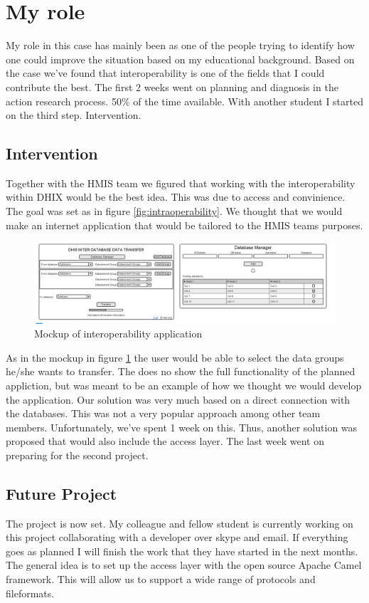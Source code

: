 \section{My role}
My role in this case has mainly been as one of the people trying to identify how one could improve the situation based on my educational background.
Based on the case we've found that interoperability is one of the fields that I could contribute the best.
The first 2 weeks went on planning and diagnosis in the action research process. 50\% of the time available. 
With another student I started on the third step. Intervention.
\subsection{Intervention}
Together with the HMIS team we figured that working with the interoperability within DHIX would be the best idea.
This was due to access and convinience. The goal was set as in figure \ref{fig:intraoperability}.
We thought that we would make an internet application that would be tailored to the HMIS teams purposes.
\begin{figure}
\centering
\includegraphics[width=24cm, angle=90, origin=c]{empirical/images/mockup}
\caption{Mockup of interoperability application}
\label{mockup}
\end{figure}
As in the mockup in figure \ref{mockup} the user would be able to select the data groups he/she wants to transfer.
The does no show the full functionality of the planned appliction, but was meant to be an example of how we thought we would develop the application.
Our solution was very much based on a direct connection with the databases. 
This was not a very popular approach among other team members. 
Unfortunately, we've spent 1 week on this. 
Thus, another solution was proposed that would also include the access layer. 
The last week went on preparing for the second project.
\subsection{Future Project}
The project is now set. 
My colleague and fellow student is currently working on this project collaborating with a developer over skype and email. 
If everything goes as planned I will finish the work that they have started in the next months.
The general idea is to set up the access layer with the open source Apache Camel framework.
This will allow us to support a wide range of protocols and fileformats.
